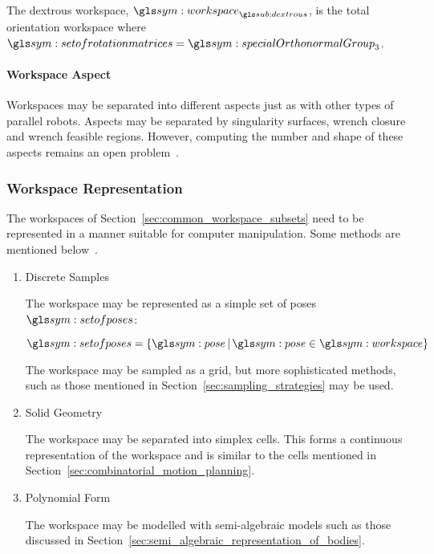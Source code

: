 				The dextrous workspace, $\workspace_{\dextrous}$, is the  total
				orientation   workspace    where	$\setofrotationmatrices    =
                \specialOrthonormalGroup{3}$.

            \paragraph{Workspace Aspect}%
            \label{sec:workspace_aspect}

				Workspaces may be separated into different aspects just as with
				other types of parallel robots. Aspects may be separated by
				singularity surfaces, wrench closure and wrench feasible
				regions. However, computing the number and shape of these
				aspects remains an open
				problem~\cite{bib:cdpr:cable_driven_parallel_robots_theory_and_application}.

		\subsubsection{Workspace Representation}%
		\label{sec:workspace_representation}

			The workspaces of Section~\ref{sec:common_workspace_subsets} need to
			be represented in a manner suitable for computer manipulation. Some
			methods are mentioned
			below~\cite{bib:cdpr:cable_driven_parallel_robots_theory_and_application}\cite{bib:planning:planning_algorithms}.

			\begin{enumerate}

				\item Discrete Samples

					The workspace may be  represented  as  a  simple  set  of
					poses $\setofposes$:

					\begin{equation}
						\setofposes =
							\left\{
								\pose
								\,\middle|\,
								\pose\in\workspace
							\right\}
					\end{equation}

					The workspace may be sampled as a grid, but  more
					sophisticated methods, such as those mentioned in
					Section~\ref{sec:sampling_strategies} may be used.

				\item Solid Geometry

					The workspace may be separated into simplex cells.	This
					forms a continuous representation of the workspace and is
					similar to the cells mentioned in
					Section~\ref{sec:combinatorial_motion_planning}.

				\item Polynomial Form

					The workspace may be modelled with semi-algebraic models
					such as those discussed in
					Section~\ref{sec:semi_algebraic_representation_of_bodies}.

			\end{enumerate}

